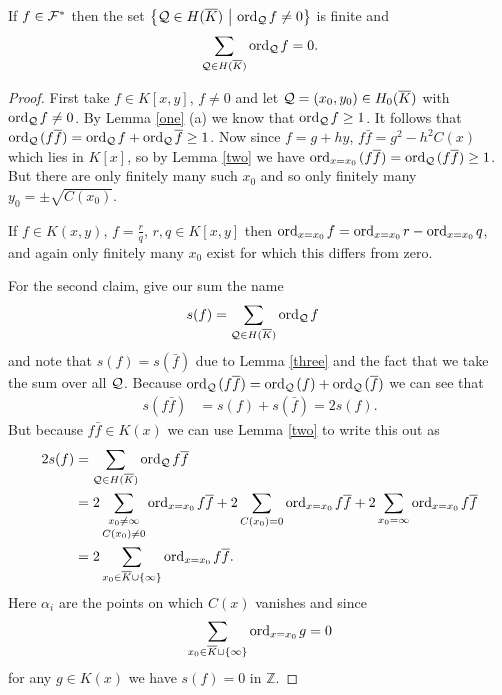 \documentclass[english,11pt,a4paper]{article}
\begin{document}
\begin{lemma}\label{sform}
  If $f \in \mathcal{F}^*$ then the set $\big \{ \mathcal{Q} \in H(\overline K) \ \big | \ \text{ord}_{\mathcal{Q}}\hspace{0.4mm} f \neq 0 \big \}$ is finite and 
  \begin{align*}
    \sum_{\q \in \ekb} \ordq f = 0.%
  \end{align*}
  \begin{proof}
    First take $f \in K[x,y]$, $f \neq 0$ and let $\mathcal{Q} = (x_0,y_0) \in H_0(\overline K)$ with $\text{ord}_{\mathcal{Q}}\hspace{0.4mm} f \neq 0$. By Lemma \ref{one} (a) we know that $\text{ord}_{\mathcal{Q}}\hspace{0.4mm} f \geq 1$. It follows that $\text{ord}_{\mathcal{Q}}\hspace{0.4mm} (f \overline f) = \text{ord}_{\mathcal{Q}}\hspace{0.4mm} f + \text{ord}_{\mathcal{Q}}\hspace{0.4mm} \overline f \geq 1$. Now since $f = g + h y$, $f \bar f = g^2 - h^2 C(x)$ which lies in $K[x]$, so by Lemma \ref{two} we have $\text{ord}_{x=x_0}\hspace{0.4mm} (f \overline f) = \text{ord}_{\mathcal{Q}}\hspace{0.4mm} (f \overline f) \geq 1$. But there are only finitely many such $x_0$ and so only finitely many $y_0 = \pm \sqrt{C(x_0)}$.

    If $f \in K(x,y)$, $f = \frac r q$, $r, q \in K[x,y]$ then $\text{ord}_{x=x_0}\hspace{0.4mm} f = \text{ord}_{x=x_0}\hspace{0.4mm} r - \text{ord}_{x=x_0}\hspace{0.4mm} q$, and again only finitely many $x_0$ exist for which this differs from zero.

    For the second claim, give our sum the name
    \begin{align*}
      s(f) &= \sum_{\mathcal{Q} \in H(\overline K)} \text{ord}_{\mathcal{Q}}\hspace{0.4mm} f
    \end{align*}
    and note that $s(f) = s(\bar f)$ due to Lemma \ref{three} and the fact that we take the sum over all $\mathcal{Q}$. Because $\text{ord}_{\mathcal{Q}}\hspace{0.4mm} (f \overline f ) = \text{ord}_{\mathcal{Q}}\hspace{0.4mm} (f) + \text{ord}_{\mathcal{Q}}\hspace{0.4mm} ( \overline f )$ we can see that
    \begin{align*}
      s(f \bar f) &= s(f) + s(\bar f) = 2 s(f).
    \end{align*}
    But because $f \bar f \in K(x)$ we can use Lemma \ref{two} to write this out as
    \begin{align*}
      2s(f) &= \sum_{\mathcal{Q} \in H(\overline K)} \text{ord}_{\mathcal{Q}}\hspace{0.4mm} f \overline f\\
            &=2 \mathop{\sum_{x_0 \neq \infty}}_{C(x_0) \neq 0} \text{ord}_{x=x_0}\hspace{0.4mm} f \overline f 
            + 2 \sum_{C(x_0) = 0} \text{ord}_{x=x_0}\hspace{0.4mm} f \overline f 
            + 2 \sum_{x_0 = \infty} \text{ord}_{x=x_0}\hspace{0.4mm} f \overline f\\
            &=2 \sum_{x_0 \in \overline K \cup \{ \infty \}} \text{ord}_{x=x_0}\hspace{0.4mm} f \overline f.
    \end{align*}
    Here $\alpha_i$ are the points on which $C(x)$ vanishes %
    and since
    \begin{align*}
      \sum_{x_0 \in \overline K \cup \{ \infty \}} \text{ord}_{x=x_0}\hspace{0.4mm} g = 0
    \end{align*}
    for any $g \in K(x)$ we have $s(f) = 0$ in $\mathds{Z}$.
  \end{proof}
\end{lemma}
\end{document}
